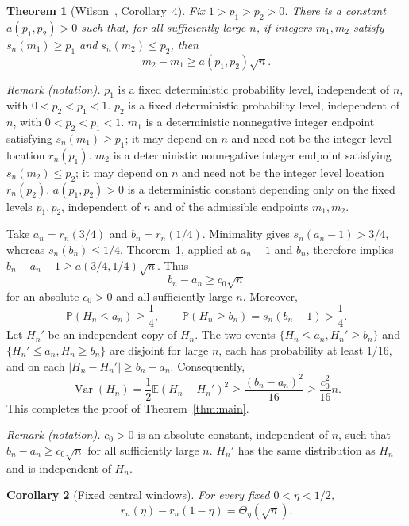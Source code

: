 \documentclass[11pt]{article}
\newtheorem{theorem}{Theorem}[section]
\newtheorem{corollary}[theorem]{Corollary}
\theoremstyle{remark}
\newcommand{\Prb}{\mathbb P}
\newcommand{\E}{\mathbb E}
\newcommand{\Var}{\operatorname{Var}}
\numberwithin{equation}{section}
\begin{document}
\begin{theorem}[Wilson~\cite{Wilson2002}, Corollary~4]
\label{thm:wilson}
Fix $1>p_1>p_2>0$. There is a constant $a(p_1,p_2)>0$ such that,
for all sufficiently large $n$, if integers $m_1,m_2$ satisfy
$s_n(m_1)\ge p_1$ and $s_n(m_2)\le p_2$, then
\[
 m_2-m_1\ge a(p_1,p_2)\sqrt n.
\]
\end{theorem}

\noindent\textit{Remark (notation).} $p_1$ is a fixed deterministic probability level, independent of $n$, with $0<p_2<p_1<1$. $p_2$ is a fixed deterministic probability level, independent of $n$, with $0<p_2<p_1<1$. $m_1$ is a deterministic nonnegative integer endpoint satisfying $s_n(m_1)\ge p_1$; it may depend on $n$ and need not be the integer level location $r_n(p_1)$. $m_2$ is a deterministic nonnegative integer endpoint satisfying $s_n(m_2)\le p_2$; it may depend on $n$ and need not be the integer level location $r_n(p_2)$. $a(p_1,p_2)>0$ is a deterministic constant depending only on the fixed levels $p_1,p_2$, independent of $n$ and of the admissible endpoints $m_1,m_2$.


Take $a_n=r_n(3/4)$ and $b_n=r_n(1/4)$. Minimality gives
$s_n(a_n-1)>3/4$, whereas $s_n(b_n)\le1/4$.
Theorem~\ref{thm:wilson}, applied at $a_n-1$ and $b_n$, therefore
implies $b_n-a_n+1\ge a(3/4,1/4)\sqrt n$. Thus
\begin{equation}
 b_n-a_n\ge c_0\sqrt n
 \label{eq:separation}
\end{equation}
for an absolute $c_0>0$ and all sufficiently large $n$.
Moreover,
\[
 \Prb(H_n\le a_n)\ge\frac14,\qquad
 \Prb(H_n\ge b_n)=s_n(b_n-1)>\frac14.
\]
Let $H_n'$ be an independent copy of $H_n$. The two events
$\{H_n\le a_n,H_n'\ge b_n\}$ and
$\{H_n'\le a_n,H_n\ge b_n\}$ are disjoint for large $n$,
each has probability at least $1/16$, and on each
$|H_n-H_n'|\ge b_n-a_n$. Consequently,
\[
 \Var(H_n)=\frac12\E(H_n-H_n')^2
       \ge\frac{(b_n-a_n)^2}{16}\ge\frac{c_0^2}{16}n.
\]
This completes the proof of Theorem~\ref{thm:main}.

\noindent\textit{Remark (notation).} $c_0>0$ is an absolute constant, independent of $n$, such that $b_n-a_n\ge c_0\sqrt n$ for all sufficiently large $n$. $H_n'$ has the same distribution as $H_n$ and is independent of $H_n$.


\begin{corollary}[Fixed central windows]
\label{cor:window}
For every fixed $0<\eta<1/2$,
\[
 r_n(\eta)-r_n(1-\eta)=\Theta_\eta(\sqrt n).
\]
\end{corollary}
\end{document}
